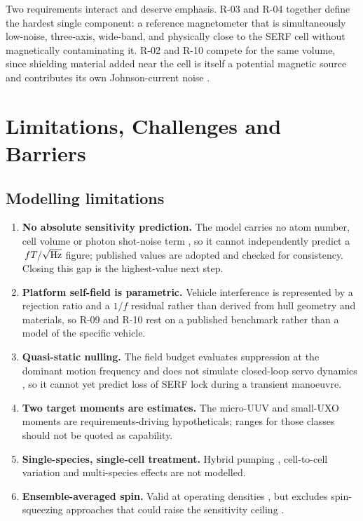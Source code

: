 \documentclass[11pt]{article}
\begin{document}
Two requirements interact and deserve emphasis. R-03 and R-04 together define the
hardest single component: a reference magnetometer that is simultaneously
low-noise, three-axis, wide-band, and physically close to the SERF cell without
magnetically contaminating it. R-02 and R-10 compete for the same volume, since
shielding material added near the cell is itself a potential magnetic source and
contributes its own Johnson-current noise \cite{lee2008}.

\section{Limitations, Challenges and Barriers}
\subsection{Modelling limitations}
\begin{enumerate}[leftmargin=1.5em]
\item \textbf{No absolute sensitivity prediction.} The model carries no atom
number, cell volume or photon shot-noise term \cite{allred2002,mitchell2020}, so
it cannot independently predict a $\,fT/\sqrt{\rm Hz}$ figure; published values
\cite{griffith2010} are adopted and checked for consistency. Closing this gap is
the highest-value next step.
\item \textbf{Platform self-field is parametric.} Vehicle interference is
represented by a rejection ratio and a $1/f$ residual rather than derived from
hull geometry and materials, so R-09 and R-10 rest on a published benchmark
\cite{oehler2024} rather than a model of the specific vehicle.
\item \textbf{Quasi-static nulling.} The field budget evaluates suppression at the
dominant motion frequency and does not simulate closed-loop servo dynamics
\cite{fang2012}, so it cannot yet predict loss of SERF lock during a transient
manoeuvre.
\item \textbf{Two target moments are estimates.} The micro-UUV and small-UXO
moments are requirements-driving hypotheticals; ranges for those classes should
not be quoted as capability.
\item \textbf{Single-species, single-cell treatment.} Hybrid pumping
\cite{ito2016}, cell-to-cell variation and multi-species effects are not modelled.
\item \textbf{Ensemble-averaged spin.} Valid at operating densities
\cite{seltzer2008}, but excludes spin-squeezing approaches that could raise the
sensitivity ceiling \cite{mitchell2020}.
\end{enumerate}
\end{document}
